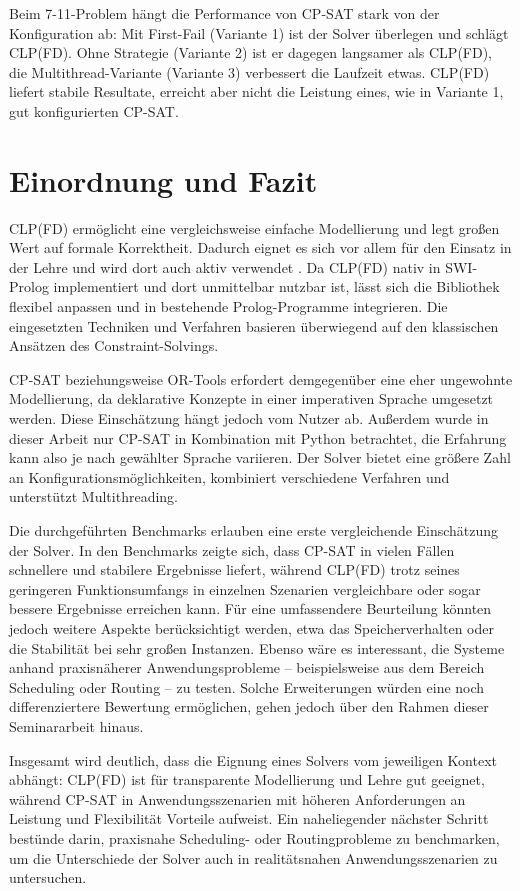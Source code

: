 \documentclass[12pt,a4paper]{article}
\begin{document}
\noindent
Beim 7-11-Problem hängt die Performance von CP-SAT stark von der Konfiguration ab: Mit First-Fail (Variante 1) ist der Solver überlegen und schlägt CLP(FD).
Ohne Strategie (Variante 2) ist er dagegen langsamer als CLP(FD), die Multithread-Variante (Variante 3) verbessert die Laufzeit etwas.
CLP(FD) liefert stabile Resultate, erreicht aber nicht die Leistung eines, wie in Variante 1, gut konfigurierten CP-SAT.
\section{Einordnung und Fazit}
CLP(FD) ermöglicht eine vergleichsweise einfache Modellierung und legt großen Wert auf formale Korrektheit.
Dadurch eignet es sich vor allem für den Einsatz in der Lehre und wird dort auch aktiv verwendet \cite{drt}.
Da CLP(FD) nativ in SWI-Prolog implementiert und dort unmittelbar nutzbar ist, lässt sich die Bibliothek flexibel anpassen und in bestehende Prolog-Programme integrieren.
Die eingesetzten Techniken und Verfahren basieren überwiegend auf den klassischen Ansätzen des Constraint-Solvings.

CP-SAT beziehungsweise OR-Tools erfordert demgegenüber eine eher ungewohnte Modellierung, da deklarative Konzepte in einer imperativen Sprache umgesetzt werden.
Diese Einschätzung hängt jedoch vom Nutzer ab.
Außerdem wurde in dieser Arbeit nur CP-SAT in Kombination mit Python betrachtet, die Erfahrung kann also je nach gewählter Sprache variieren. 
Der Solver bietet eine größere Zahl an Konfigurationsmöglichkeiten, kombiniert verschiedene Verfahren und unterstützt Multithreading.

Die durchgeführten Benchmarks erlauben eine erste vergleichende Einschätzung der Solver.
In den Benchmarks zeigte sich, dass CP-SAT in vielen Fällen schnellere und stabilere Ergebnisse liefert, während CLP(FD) trotz seines geringeren Funktionsumfangs in einzelnen Szenarien vergleichbare oder sogar bessere Ergebnisse erreichen kann.
Für eine umfassendere Beurteilung könnten jedoch weitere Aspekte berücksichtigt werden, etwa das Speicherverhalten oder die Stabilität bei sehr großen Instanzen.
Ebenso wäre es interessant, die Systeme anhand praxisnäherer Anwendungsprobleme -- beispielsweise aus dem Bereich Scheduling oder Routing -- zu testen.
Solche Erweiterungen würden eine noch differenziertere Bewertung ermöglichen, gehen jedoch über den Rahmen dieser Seminararbeit hinaus.

Insgesamt wird deutlich, dass die Eignung eines Solvers vom jeweiligen Kontext abhängt: CLP(FD) ist für transparente Modellierung und Lehre gut geeignet, während CP-SAT in Anwendungsszenarien mit höheren Anforderungen an Leistung und Flexibilität Vorteile aufweist.
Ein naheliegender nächster Schritt bestünde darin, praxisnahe Scheduling- oder Routingprobleme zu benchmarken, um die Unterschiede der Solver auch in realitätsnahen Anwendungsszenarien zu untersuchen.
\end{document}
